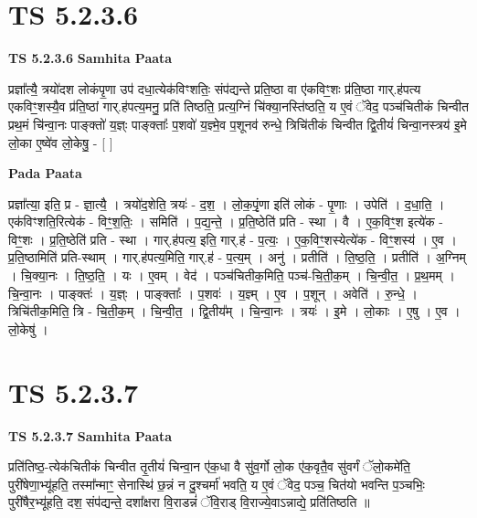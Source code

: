 \documentclass[17pt]{extarticle}
\begin{document}

\section{ TS 5.2.3.6 }

\textbf{TS 5.2.3.6 } \newline
\textbf{Samhita Paata} \newline

प्रज्ञा᳚त्यै॒ त्रयो॑दश लोकंपृ॒णा उप॑ दधा॒त्येक॑विꣳशतिः॒ संप॑द्यन्ते प्रति॒ष्ठा वा ए॑कविꣳ॒॒शः प्र॑ति॒ष्ठा गार्.ह॑पत्य एकविꣳ॒॒शस्यै॒व प्र॑ति॒ष्ठां गार्.ह॑पत्य॒मनु॒ प्रति॑ तिष्ठति॒ प्रत्य॒ग्निं चि॑क्या॒नस्ति॑ष्ठति॒ य ए॒वं ॅवेद॒ पञ्च॑चितीकं चिन्वीत प्रथ॒मं चि॑न्वा॒नः पाङ्क्तो॑ य॒ज्ञ्ः पाङ्क्ताः᳚ प॒शवो॑ य॒ज्ञ्मे॒व प॒शूनव॑ रुन्धे॒ त्रिचि॑तीकं चिन्वीत द्वि॒तीयं॑ चिन्वा॒नस्त्रय॑ इ॒मे लो॒का ए॒ष्वे॑व लो॒केषु॒ - [  ] \newline

\textbf{Pada Paata} \newline

प्रज्ञा᳚त्या॒ इति॒ प्र - ज्ञा॒त्यै॒ । त्रयो॑द॒शेति॒ त्रयः॑ - द॒श॒ । लो॒क॒पृं॒णा इति॑ लोकं - पृ॒णाः । उपेति॑ । द॒धा॒ति॒ । एक॑विꣳशति॒रित्येक॑ - विꣳ॒॒श॒तिः॒ । समिति॑ । प॒द्य॒न्ते॒ । प्र॒ति॒ष्ठेति॑ प्रति - स्था । वै । ए॒क॒विꣳ॒॒श इत्ये॑क - विꣳ॒॒शः । प्र॒ति॒ष्ठेति॑ प्रति - स्था । गार्.ह॑पत्य॒ इति॒ गार्.ह॑ - प॒त्यः॒ । ए॒क॒विꣳ॒॒शस्येत्ये॑क - विꣳ॒॒शस्य॑ । ए॒व । प्र॒ति॒ष्ठामिति॑ प्रति-स्थाम् । गार्.ह॑पत्य॒मिति॒ गार्.ह॑ - प॒त्य॒म् । अनु॑ । प्रतीति॑ । ति॒ष्ठ॒ति॒ । प्रतीति॑ । अ॒ग्निम् । चि॒क्या॒नः । ति॒ष्ठ॒ति॒ । यः । ए॒वम् । वेद॑ । पञ्च॑चितीक॒मिति॒ पञ्च॑-चि॒ती॒क॒म् । चि॒न्वी॒त॒ । प्र॒थ॒मम् । चि॒न्वा॒नः । पाङ्क्तः॑ । य॒ज्ञ्ः । पाङ्क्ताः᳚ । प॒शवः॑ । य॒ज्ञ्म् । ए॒व । प॒शून् । अवेति॑ । रु॒न्धे॒ । त्रिचि॑तीक॒मिति॒ त्रि - चि॒ती॒क॒म् । चि॒न्वी॒त॒ । द्वि॒तीय᳚म् । चि॒न्वा॒नः । त्रयः॑ । इ॒मे । लो॒काः । ए॒षु । ए॒व । लो॒केषु॑ ।  \newline





\section{ TS 5.2.3.7 }

\textbf{TS 5.2.3.7 } \newline
\textbf{Samhita Paata} \newline

प्रति॑तिष्ठ॒-त्येक॑चितीकं चिन्वीत तृ॒तीयं॑ चिन्वा॒न ए॑क॒धा वै सु॑व॒र्गो लो॒क ए॑क॒वृतै॒व सु॑वर्गं ॅलो॒कमे॑ति॒ पुरी॑षेणा॒भ्यू॑हति॒ तस्मा᳚न्माꣳ॒॒ सेनास्थि॑ छ॒न्नं न दु॒श्चर्मा॑ भवति॒ य ए॒वं ॅवेद॒ पञ्च॒ चित॑यो भवन्ति प॒ञ्चभिः॒ पुरी॑षैर॒भ्यू॑हति॒ दश॒ संप॑द्यन्ते॒ दशा᳚क्षरा वि॒राडन्नं॑ ॅवि॒राड् वि॒राज्ये॒वाऽन्नाद्ये॒ प्रति॑तिष्ठति ॥ \newline
\end{document}
